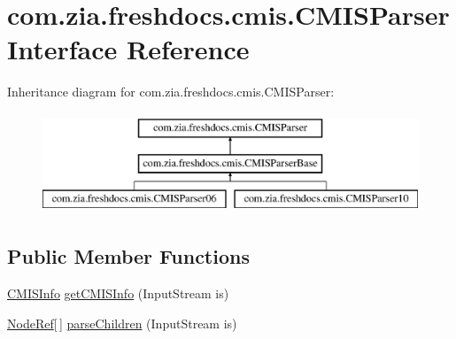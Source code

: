 \hypertarget{interfacecom_1_1zia_1_1freshdocs_1_1cmis_1_1_c_m_i_s_parser}{\section{com.\-zia.\-freshdocs.\-cmis.\-C\-M\-I\-S\-Parser Interface Reference}
\label{interfacecom_1_1zia_1_1freshdocs_1_1cmis_1_1_c_m_i_s_parser}
}
Inheritance diagram for com.\-zia.\-freshdocs.\-cmis.\-C\-M\-I\-S\-Parser\-:\begin{figure}[H]
\begin{center}
\leavevmode
\includegraphics[height=3.000000cm]{interfacecom_1_1zia_1_1freshdocs_1_1cmis_1_1_c_m_i_s_parser}
\end{center}
\end{figure}
\subsection*{Public Member Functions}
\begin{DoxyCompactItemize}
\item 
\hyperlink{classcom_1_1zia_1_1freshdocs_1_1cmis_1_1_c_m_i_s_info}{C\-M\-I\-S\-Info} \hyperlink{interfacecom_1_1zia_1_1freshdocs_1_1cmis_1_1_c_m_i_s_parser_aaf7b102ea8335d71ae170d95732b0a1a}{get\-C\-M\-I\-S\-Info} (Input\-Stream is)
\item 
\hyperlink{classcom_1_1zia_1_1freshdocs_1_1model_1_1_node_ref}{Node\-Ref}\mbox{[}$\,$\mbox{]} \hyperlink{interfacecom_1_1zia_1_1freshdocs_1_1cmis_1_1_c_m_i_s_parser_ab0d011700afbe93740fb08166886fd2c}{parse\-Children} (Input\-Stream is)
\end{DoxyCompactItemize}


